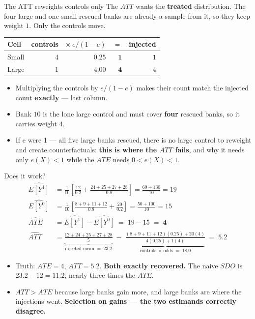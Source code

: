\documentclass[
  11pt,
  ignorenonframetext,
  aspectratio=169,
]{beamer}
\providecommand{\tightlist}{%
  \setlength{\itemsep}{0pt}\setlength{\parskip}{0pt}}
\begin{document}
\begin{frame}{The ATT reweights controls only}
\protect{}\label{the-att-reweights-controls-only}
The \(ATT\) wants the \textbf{treated} distribution. The four large and
one small rescued banks are already a sample from it, so they keep
weight \(1\). Only the controls move.

\begin{center}
\small
\begin{tabular}{lrrrr}
\toprule
Cell & controls & $\times\ e/(1-e)$ & $=$ & injected \\
\midrule
Small & $4$ & $0.25$ & $\mathbf{1}$ & $1$ \\
Large & $1$ & $4.00$ & $\mathbf{4}$ & $4$ \\
\bottomrule
\end{tabular}
\end{center}

\begin{itemize}
\tightlist
\item
  Multiplying the controls by \(e/(1-e)\) makes their count match the
  injected count \textbf{exactly} --- last column.
\item
  Bank \(10\) is the lone large control and must cover \textbf{four}
  rescued banks, so it carries weight \(4\).
\item
  If e were 1 --- all five large banks rescued, there is no large
  control to reweight and create counterfactuals: \textbf{this is where
  the \(ATT\) fails}, and why it needs only \(e(X) < 1\) while the
  \(ATE\) needs \(0 < e(X) < 1\).
\end{itemize}
\end{frame}

\begin{frame}{Does it work?}
\protect{}\label{does-it-work}
\[
\begin{aligned}
\widehat{E[Y^1]} &= \tfrac{1}{10}\!\left[\tfrac{12}{0.2} + \tfrac{24+25+27+28}{0.8}\right] = \tfrac{60 + 130}{10} = 19 \\
\widehat{E[Y^0]} &= \tfrac{1}{10}\!\left[\tfrac{8+9+11+12}{0.8} + \tfrac{20}{0.2}\right] = \tfrac{50 + 100}{10} = 15 \\[0.3em]
\widehat{ATE}\; &= \widehat{E[Y^1]} - \widehat{E[Y^0]} \;=\; 19 - 15 \;=\; \mathbf{4} \\[0.3em]
\widehat{ATT}\; &= \underbrace{\tfrac{12 + 24+25+27+28}{5}}_{\text{injected mean}\;=\;23.2} \;-\; \underbrace{\tfrac{(8+9+11+12)(0.25) + 20(4)}{4(0.25) + 1(4)}}_{\text{controls}\,\times\,\text{odds}\;=\;18.0} \;=\; \mathbf{5.2}
\end{aligned}
\]

\begin{itemize}
\tightlist
\item
  Truth: \(ATE = 4\), \(ATT = 5.2\). \textbf{Both exactly recovered.}
  The naive \(SDO\) is \(23.2 - 12 = \mathbf{11.2}\), nearly three times
  the \(ATE\).
\item
  \(ATT > ATE\) because large banks gain more, and large banks are where
  the injections went. \textbf{Selection on gains --- the two estimands
  correctly disagree.}
\end{itemize}
\end{frame}
\end{document}

